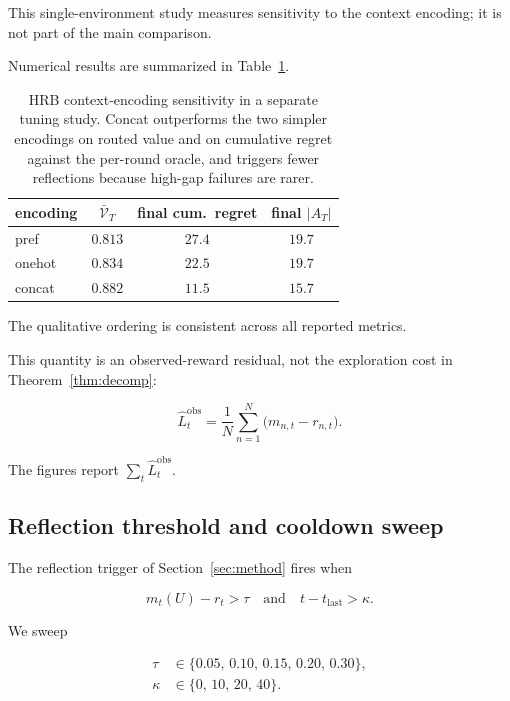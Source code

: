 \documentclass{article} %
\begin{document}
This single-environment study measures sensitivity to the context encoding; it is not part of the main comparison.

Numerical results are summarized in Table~\ref{tab:app-ctx-type}.

\begin{table}[h]
\centering
\small
\begin{tabular}{lccc}
\toprule
encoding & $\bar{\mathcal{V}}_T$ & final cum.\ regret & final $|A_T|$ \\
\midrule
pref     & $0.813$ & $27.4$ & $19.7$ \\
onehot   & $0.834$ & $22.5$ & $19.7$ \\
concat   & $0.882$ & $11.5$ & $15.7$ \\
\bottomrule
\end{tabular}
\caption{HRB context-encoding sensitivity in a separate tuning study. Concat outperforms the two simpler encodings on routed value and on cumulative regret against the per-round oracle, and triggers fewer reflections because high-gap failures are rarer.}
\label{tab:app-ctx-type}
\end{table}

The qualitative ordering is consistent across all reported metrics.

This quantity is an observed-reward residual, not the exploration cost in
Theorem~\ref{thm:decomp}:

\begin{equation}
\label{eq:app-emp-LT-recap}
\hat L_t^{\mathrm{obs}}
=
\frac{1}{N}\sum_{n=1}^{N}\big(m_{n,t}-r_{n,t}\big).
\end{equation}

The figures report \(\sum_t\hat L_t^{\mathrm{obs}}\).

\subsection{Reflection threshold and cooldown sweep}

\label{app:reflection-sweep}

The reflection trigger of Section~\ref{sec:method} fires when

\begin{equation}
\label{eq:app-trigger-recap}
m_t(U)-r_t > \tau \quad\text{and}\quad t-t_{\text{last}}>\kappa.
\end{equation}

We sweep

\begin{align}
\label{eq:app-tau-grid}
\tau &\in \{0.05,\,0.10,\,0.15,\,0.20,\,0.30\},\\
\label{eq:app-kappa-grid}
\kappa &\in \{0,\,10,\,20,\,40\}.
\end{align}
\end{document}
